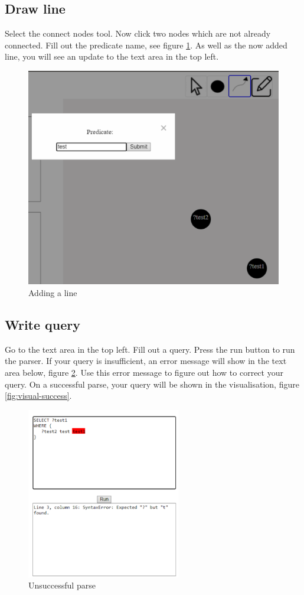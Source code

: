 \subsection{Draw line}
Select the connect nodes tool. Now click two nodes which are not already connected. Fill out the predicate name, see figure \ref{fig:user-line}. As well as the now added line, you will see an update to the text area in the top left.
\begin{figure}[H]
    \centering
    \includegraphics{figures/add-line-user.pdf}
    \caption{Adding a line}
    \label{fig:user-line}
\end{figure}
\subsection{Write query}
Go to the text area in the top left. Fill out a query. Press the run button to run the parser. If your query is insufficient, an error message will show in the text area below, figure \ref{fig:user-write-error}. Use this error message to figure out how to correct your query. On a successful parse, your query will be shown in the visualisation, figure \ref{fig:visual-success}.
\begin{figure}[H]
    \centering
    \includegraphics[width=0.6\textwidth]{figures/user-write-error.pdf}
    \caption{Unsuccessful parse}
    \label{fig:user-write-error}
\end{figure}

